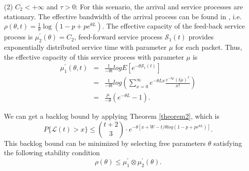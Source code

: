 \documentclass[12pt]{article}
\begin{document}
(2) $C_2<+\infty$ and $\tau> 0$: For this scenario, the arrival and service processes are stationary. The effective bandwidth of the arrival process can be found in \cite{Chan94}, i.e. $\rho(\theta,t)=\frac{1}{\theta}\log(1-p+pe^{\theta L})$. The effective capacity of the feed-back service process is $\mu_2^\prime(\theta)=C_2$, feed-forward service process $\mathcal{S}_1(t)$ provides exponentially distributed service time with parameter $\mu$ for each packet. Thus, the effective capacity of this service process with parameter $\mu$ is
\begin{eqnarray*}
\mu_1^\prime(\theta,t)&=& \frac{1}{-\theta t}log E[e^{-\theta \mathcal{S}_1(t)}]\\
&=& \frac{1}{-\theta t}log(\sum_{x=0}^\infty e^{-\theta Lx}\frac{e^{-t\mu}(t\mu)^x}{x!})\\
&=& \frac{\mu}{-\theta}(e^{-\theta L}-1).
\end{eqnarray*}

We can get a backlog bound by applying Theorem \ref{theorem2}, which is
\begin{equation}\label{bernoullibound}
P\{\mathcal{L}(t)>x\}\leq {t+2\choose 3}\cdot e^{-\theta [x+W-t/\theta log(1-p+pe^{\theta L})]}.
\end{equation}
This backlog bound can be minimized by selecting free parameters $\theta$ satisfying the following stability condition
\begin{equation}\label{stabilitycond3}
\rho(\theta)\leq \mu_1^\prime\otimes\mu_2^\prime(\theta).
\end{equation}
\end{document}
